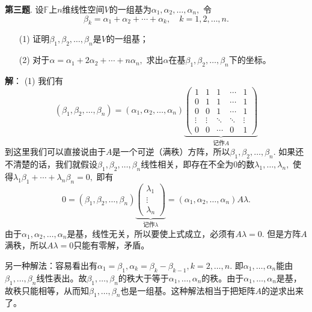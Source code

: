 \fi  %

\newpageorvspace

{\bf 第三题}. 设$\mathbb{F}$上$n$维线性空间$V$的一组基为$\alpha_1, \alpha_2, \ldots, \alpha_n,$ 令
$$\beta_k = \alpha_1 + \alpha_2 + \cdots + \alpha_k, \quad k = 1, 2, \ldots, n.$$
\begin{itemize}
\item[(1)] 证明$\beta_1, \beta_2, \ldots, \beta_n$是$V$的一组基；
\item[(2)] 对于$\alpha = \alpha_1 + 2 \alpha_2 + \cdots + n \alpha_n,$ 求出$\alpha$在基$\beta_1, \beta_2, \ldots, \beta_n$下的坐标。
\end{itemize}

\ifIncludeAnswer

\newpageorvspace

{\bf 解}： (1) 我们有
$$(\beta_1, \beta_2, \ldots, \beta_n) = (\alpha_1, \alpha_2, \ldots, \alpha_n) \underbrace{ \begin{pmatrix} 1 & 1 & 1 & \cdots & 1 \\ 0 & 1 & 1 & \cdots & 1 \\ 0 & 0 & 1 & \cdots & 1 \\ \vdots & \vdots & \ddots & \ddots & \vdots \\ 0 & 0 & \cdots & 0 & 1 \end{pmatrix} }_{\text{记作} A}$$
到这里我们可以直接说由于$A$是一个可逆（满秩）方阵，所以$\beta_1, \beta_2, \ldots, \beta_n.$ 如果还不清楚的话，我们就假设$\beta_1, \beta_2, \ldots, \beta_n$线性相关，即存在不全为0的数$\lambda_1, \ldots, \lambda_n,$ 使得$\lambda_1 \beta_1 + \cdots + \lambda_n \beta_n = 0,$ 即有
$$0 = (\beta_1, \beta_2, \ldots, \beta_n) \underbrace{ \begin{pmatrix} \lambda_1 \\ \vdots \\ \lambda_n \end{pmatrix} }_{\text{记作} \lambda} = (\alpha_1, \alpha_2, \ldots, \alpha_n) A \lambda.$$
由于$\alpha_1, \alpha_2, \ldots, \alpha_n$是基，线性无关，所以要使上式成立，必须有$A\lambda = 0.$ 但是方阵$A$满秩，所以$A\lambda = 0$只能有零解，矛盾。

另一种解法：容易看出有$\alpha_1 = \beta_1, \alpha_k = \beta_k - \beta_{k-1}, k = 2, \ldots, n.$ 即$\alpha_1, \ldots, \alpha_n$能由$\beta_1, \ldots, \beta_n$线性表出。故$\beta_1, \ldots, \beta_n$的秩大于等于$\alpha_1, \ldots, \alpha_n$的秩。由于$\alpha_1, \ldots, \alpha_n$是基，故秩只能相等，从而知$\beta_1, \ldots, \beta_n$也是一组基。这种解法相当于把矩阵$A$的逆求出来了。

